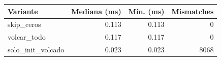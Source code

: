 \begin{tabular}{lrrr}
\toprule
Variante & Mediana (ms) & Mín. (ms) & Mismatches \\
\midrule
skip\_ceros & 0.113 & 0.113 & 0 \\
volcar\_todo & 0.117 & 0.117 & 0 \\
solo\_init\_volcado & 0.023 & 0.023 & 8068 \\
\bottomrule
\end{tabular}
